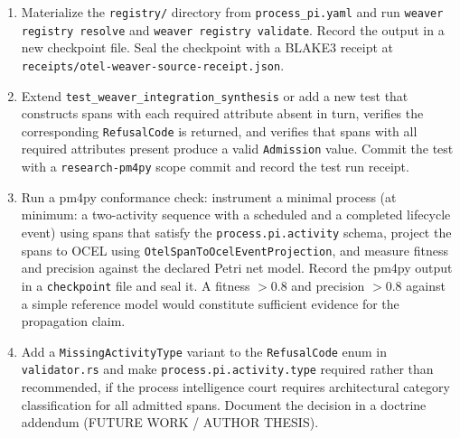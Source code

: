 \begin{enumerate}
  \item Materialize the \texttt{registry/} directory from \texttt{process\_pi.yaml} and run
        \texttt{weaver registry resolve} and \texttt{weaver registry validate}. Record the
        output in a new checkpoint file. Seal the checkpoint with a BLAKE3 receipt at
        \texttt{receipts/otel-weaver-source-receipt.json}.
  \item Extend \texttt{test\_weaver\_integration\_synthesis} or add a new test that constructs
        spans with each required attribute absent in turn, verifies the corresponding
        \texttt{RefusalCode} is returned, and verifies that spans with all required attributes
        present produce a valid \texttt{Admission} value. Commit the test with a
        \texttt{research-pm4py} scope commit and record the test run receipt.
  \item Run a pm4py conformance check: instrument a minimal process (at minimum: a two-activity
        sequence with a scheduled and a completed lifecycle event) using spans that satisfy the
        \texttt{process.pi.activity} schema, project the spans to OCEL using
        \texttt{OtelSpanToOcelEventProjection}, and measure fitness and precision against the
        declared Petri net model. Record the pm4py output in a \texttt{checkpoint} file and
        seal it. A fitness $> 0.8$ and precision $> 0.8$ against a simple reference model
        would constitute sufficient evidence for the propagation claim.
  \item Add a \texttt{MissingActivityType} variant to the \texttt{RefusalCode} enum in
        \texttt{validator.rs} and make \texttt{process.pi.activity.type} required rather than
        recommended, if the process intelligence court requires architectural category
        classification for all admitted spans. Document the decision in a doctrine addendum
        (FUTURE WORK / AUTHOR THESIS).
\end{enumerate}
